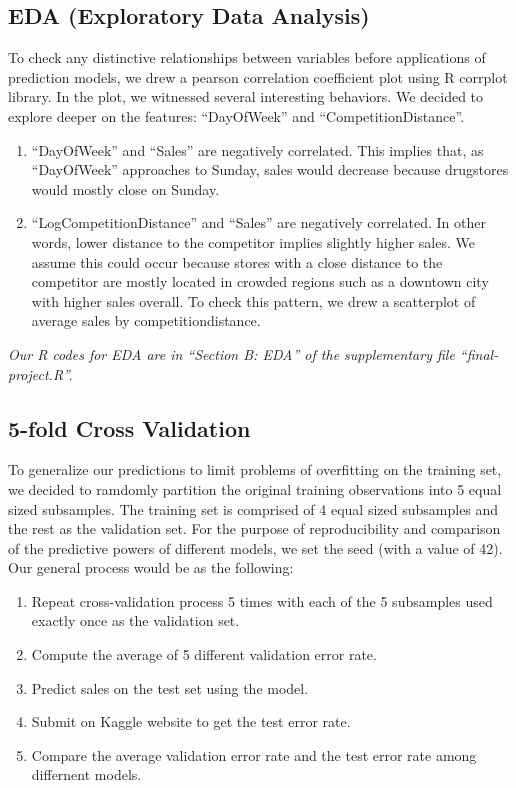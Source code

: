 \documentclass[letterpaper,twocolumn,11pt]{article}
\begin{document}
\subsection{EDA (Exploratory Data Analysis)}
To check any distinctive relationships between variables before applications of prediction models, we drew a pearson correlation coefficient plot using R corrplot library. In the plot, we witnessed several interesting behaviors. We decided to explore deeper on the features: ``DayOfWeek'' and ``CompetitionDistance''.
\begin{enumerate}
\item ``DayOfWeek'' and ``Sales'' are negatively correlated. This implies that, as ``DayOfWeek'' approaches to Sunday, sales would decrease because drugstores would mostly close on Sunday. 
\item ``LogCompetitionDistance'' and ``Sales'' are negatively correlated. In other words, lower distance to the competitor implies slightly higher sales. We assume this could occur because stores with a close distance to the competitor are mostly located in crowded regions such as a downtown city with higher sales overall. To check this pattern, we drew a scatterplot of average sales by competitiondistance. 
\end{enumerate}


\textit{Our R codes for EDA are in ``Section B: EDA'' of the supplementary file ``final-project.R''.}

\subsection{5-fold Cross Validation}
To generalize our predictions to limit problems of overfitting on the training set, we decided to ramdomly partition the original training observations into 5 equal sized subsamples. The training set is comprised of 4 equal sized subsamples and the rest as the validation set. For the purpose of reproducibility and comparison of the predictive powers of different models, we set the seed (with a value of 42). Our general process would be as the following:
\begin{enumerate}
\item  Repeat cross-validation process 5 times with each of the 5 subsamples used exactly once as the validation set.
\item Compute the average of 5 different validation error rate. 
\item Predict sales on the test set using the model. 
\item Submit on Kaggle website to get the test error rate.
\item Compare the average validation error rate and the test error rate among differnent models.
\end{enumerate}
  
\end{document}
